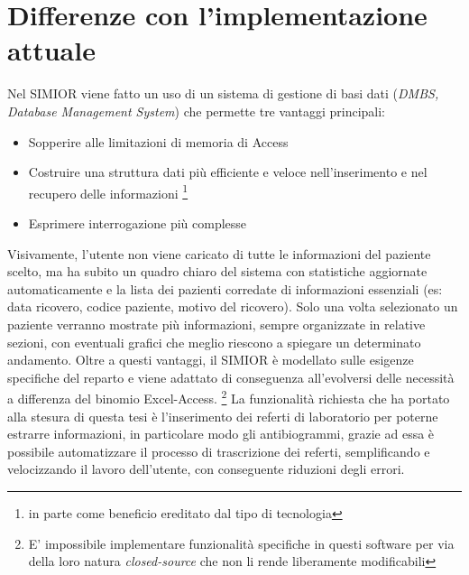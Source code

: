 \section{Differenze con l'implementazione attuale}
Nel SIMIOR viene fatto un uso di un sistema di gestione di basi dati (\textit{DMBS, Database Management System}) che permette tre vantaggi principali:
\begin{itemize}
	\item Sopperire alle limitazioni di memoria di Access
	\item Costruire una struttura dati più efficiente e veloce nell'inserimento e nel recupero delle informazioni \footnote{in parte come beneficio ereditato dal tipo di tecnologia}
	\item Esprimere interrogazione più complesse
\end{itemize}
Visivamente, l'utente non viene caricato di tutte le informazioni del paziente scelto, ma ha subito un quadro chiaro del sistema con statistiche aggiornate automaticamente e la lista dei pazienti corredate di informazioni essenziali (es: data ricovero, codice paziente, motivo del ricovero). Solo una volta selezionato un paziente verranno mostrate più informazioni, sempre organizzate in relative sezioni, con eventuali grafici che meglio riescono a spiegare un determinato andamento.
Oltre a questi vantaggi, il SIMIOR è modellato sulle esigenze specifiche del reparto e viene adattato di conseguenza all'evolversi delle necessità a differenza del binomio Excel-Access. \footnote{E' impossibile implementare funzionalità specifiche in questi software per via della loro natura \textit{closed-source} che non li rende liberamente modificabili}
La funzionalità richiesta che ha portato alla stesura di questa tesi è l'inserimento dei referti di laboratorio per poterne estrarre informazioni, in particolare modo gli antibiogrammi, grazie ad essa è possibile automatizzare il processo di trascrizione dei referti, semplificando e velocizzando il lavoro dell'utente, con conseguente riduzioni degli errori.



%
%



